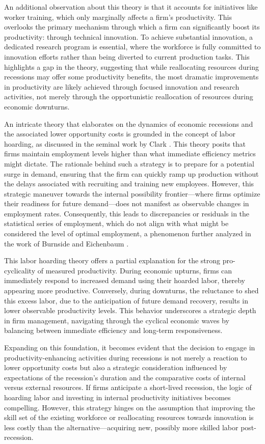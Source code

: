 \documentclass[12pt]{article}
\begin{document}
An additional observation about this theory is that it accounts for initiatives like worker training, which only
marginally affects a firm's productivity. This overlooks the primary mechanism through which a firm can significantly
boost its productivity: through technical innovation. To achieve substantial innovation, a dedicated research program is
essential, where the workforce is fully committed to innovation efforts rather than being diverted to current production
tasks. This highlights a gap in the theory, suggesting that while reallocating resources during recessions may offer
some productivity benefits, the most dramatic improvements in productivity are likely achieved through focused
innovation and research activities, not merely through the opportunistic reallocation of resources during economic
downturns. 

An intricate theory that elaborates on the dynamics of economic recessions and the associated lower opportunity costs is
grounded in the concept of labor hoarding, as discussed in the seminal work by Clark \cite{Cla73}. This theory posits
that firms maintain employment levels higher than what immediate efficiency metrics might dictate. The rationale behind
such a strategy is to prepare for a potential surge in demand, ensuring that the firm can quickly ramp up production
without the delays associated with recruiting and training new employees. However, this strategic maneuver towards the
internal possibility frontier—where firms optimize their readiness for future demand—does not manifest as observable
changes in employment rates. Consequently, this leads to discrepancies or residuals in the statistical series of
employment, which do not align with what might be considered the level of optimal employment, a phenomenon further
analyzed in the work of Burnside and Eichenbaum \cite{BurnCrai93}. 

This labor hoarding theory offers a partial explanation for the strong pro-cyclicality of measured productivity. During
economic upturns, firms can immediately respond to increased demand using their hoarded labor, thereby appearing more
productive. Conversely, during downturns, the reluctance to shed this excess labor, due to the anticipation of future
demand recovery, results in lower observable productivity levels. This behavior underscores a strategic depth in firm
management, navigating through the cyclical economic waves by balancing between immediate efficiency and long-term
responsiveness. 

Expanding on this foundation, it becomes evident that the decision to engage in productivity-enhancing activities during
recessions is not merely a reaction to lower opportunity costs but also a strategic consideration influenced by
expectations of the recession's duration and the comparative costs of internal versus external resources. If firms
anticipate a short-lived recession, the logic of hoarding labor and investing in internal productivity initiatives
becomes compelling. However, this strategy hinges on the assumption that improving the skill set of the existing
workforce or reallocating resources towards innovation is less costly than the alternative—acquiring new, possibly more
skilled labor post-recession. 
\end{document}
